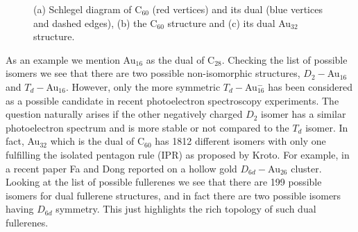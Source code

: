\begin{figure}[htb]
\begin{center}
    \hspace{0.05\textwidth}
    \hspace{0.034\textwidth}
\caption{(a) Schlegel diagram of C$_{60}$ (red vertices) and its dual (blue vertices and dashed edges), (b) the C$_{60}$ structure and (c) its dual Au$_{32}$ structure.}
\label{fig:C60dual}
\end{center}
\end{figure}

As an example we mention Au$_{16}$ as the dual of C$_{28}$. Checking the list of possible isomers\autocite{Brinkmann_HouseGraphsdatabase_2013} we see that there are two possible non-isomorphic structures, $D_2-$Au$_{16}$ and $T_d-$Au$_{16}$. However, only the more symmetric $T_d-$Au$_{16}^-$ has been considered as a possible candidate in recent photoelectron spectroscopy experiments.\autocite{Bulusu_Evidencehollowgolden_2006} The question naturally arises if the other negatively charged $D_2$ isomer has a similar photoelectron spectrum and is more stable or not compared to the $T_d$ isomer. In fact, Au$_{32}$ which is the dual of C$_{60}$ has 1812 different isomers with only one fulfilling the isolated pentagon rule (IPR) as proposed by Kroto.\autocite{Kroto_stabilityfullerenesCn_1987} For example, in a recent paper Fa and Dong reported on a hollow gold $D_{6d}-$Au$_{26}$ cluster.\autocite{Fa-Dong-2006,Fa-Luong-2008} Looking at the list of possible fullerenes we see that there are 199 possible isomers for dual fullerene structures, and in fact there are two possible isomers having $D_{6d}$ symmetry. This just highlights the rich topology of such dual fullerenes.

